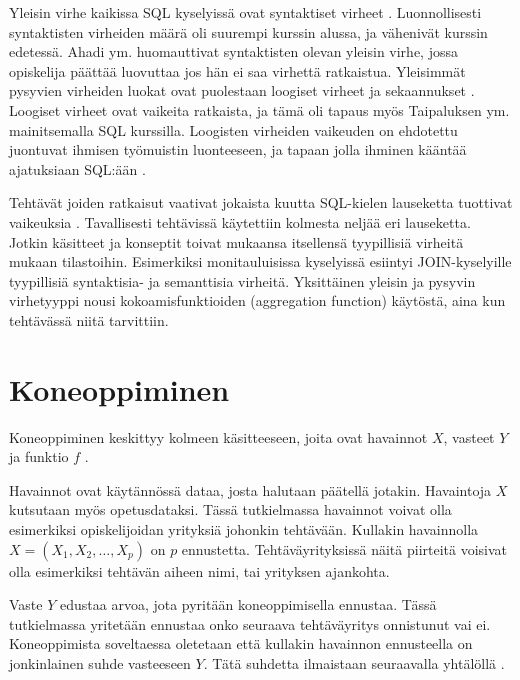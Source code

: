 \documentclass[finnish,twoside,openright]{HYgraduMLDS}
\begin{document}
Yleisin virhe kaikissa SQL kyselyissä ovat syntaktiset virheet \cite{Taipalus:2019:EFS:3287324.3287359, Ahadi:2016:SSM:2839509.2844640}. Luonnollisesti syntaktisten virheiden määrä oli suurempi kurssin alussa, ja vähenivät kurssin edetessä. Ahadi ym. \cite{Ahadi:2016:SSM:2839509.2844640} huomauttivat syntaktisten olevan yleisin virhe, jossa opiskelija päättää luovuttaa jos hän ei saa virhettä ratkaistua. Yleisimmät pysyvien virheiden luokat ovat puolestaan loogiset virheet ja sekaannukset \cite{Taipalus:2019:EFS:3287324.3287359}. Loogiset virheet ovat vaikeita ratkaista, ja tämä oli tapaus myös Taipaluksen ym. \cite{Taipalus:2019:EFS:3287324.3287359} mainitsemalla SQL kurssilla. Loogisten virheiden vaikeuden on ehdotettu juontuvat ihmisen työmuistin luonteeseen, ja tapaan jolla ihminen kääntää ajatuksiaan SQL:ään \cite{SMELCER1995353}. 

Tehtävät joiden ratkaisut vaativat jokaista kuutta SQL-kielen lauseketta tuottivat vaikeuksia \cite{Taipalus:2019:EFS:3287324.3287359}. Tavallisesti tehtävissä käytettiin kolmesta neljää eri lauseketta. Jotkin käsitteet ja konseptit toivat mukaansa itsellensä tyypillisiä virheitä mukaan tilastoihin. Esimerkiksi monitauluisissa kyselyissä esiintyi JOIN-kyselyille tyypillisiä syntaktisia- ja semanttisia virheitä. Yksittäinen yleisin ja pysyvin virhetyyppi nousi kokoamisfunktioiden (aggregation function) käytöstä, aina kun tehtävässä niitä tarvittiin. 


\section{Koneoppiminen}

Koneoppiminen keskittyy kolmeen käsitteeseen, joita ovat havainnot $X$, vasteet $Y$ ja funktio $f$ \cite{james2013ISLR}.

Havainnot ovat käytännössä dataa, josta halutaan päätellä jotakin. Havaintoja $X$ kutsutaan myös opetusdataksi. Tässä tutkielmassa havainnot voivat olla esimerkiksi opiskelijoidan yrityksiä johonkin tehtävään. Kullakin havainnolla $X = (X_1, X_2, \dots, X_p)$ on $p$ ennustetta. Tehtäväyrityksissä näitä piirteitä voisivat olla esimerkiksi tehtävän aiheen nimi, tai yrityksen ajankohta.

Vaste $Y$ edustaa arvoa, jota pyritään koneoppimisella ennustaa. Tässä tutkielmassa yritetään ennustaa onko seuraava tehtäväyritys onnistunut vai ei. Koneoppimista soveltaessa oletetaan että kullakin havainnon ennusteella on jonkinlainen suhde vasteeseen $Y$. Tätä suhdetta ilmaistaan seuraavalla yhtälöllä \cite{james2013ISLR}.
\end{document}
